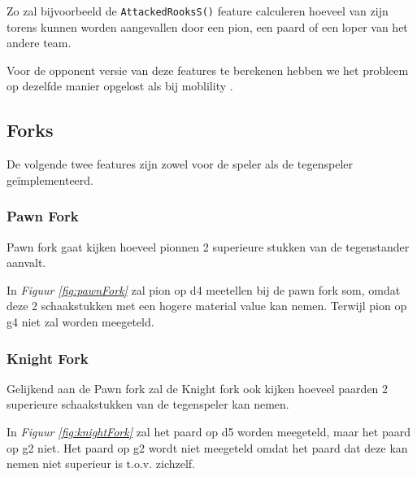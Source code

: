 \documentclass[a4paper,openany]{uantwerpenassignment}
\newcommand{\codeword}[1]{
    \colorbox{code}{\texttt{\textcolor{codetext}{#1}}}
}
\newcommand{\figref}[1]{\textit{Figuur \ref{#1}}}
\begin{document}
Zo zal bijvoorbeeld de \codeword{AttackedRooksS()} feature calculeren hoeveel van zijn torens kunnen worden aangevallen door een pion, een paard of een loper van het andere team.

Voor de opponent versie van deze features te berekenen hebben we het probleem op dezelfde manier opgelost als bij moblility .

\subsection{Forks}

De volgende twee features zijn zowel voor de speler als de tegenspeler geïmplementeerd.

\subsubsection{Pawn Fork}
Pawn fork gaat kijken hoeveel pionnen 2 superieure stukken van de tegenstander aanvalt.

In \figref{fig:pawnFork} zal pion op d4 meetellen bij de pawn fork som, omdat deze 2 schaakstukken met een hogere material value kan nemen. Terwijl pion op g4 niet zal worden meegeteld.

\subsubsection{Knight Fork}
Gelijkend aan de Pawn fork zal de Knight fork ook kijken hoeveel paarden 2 superieure schaakstukken van de tegenspeler kan nemen.

In \figref{fig:knightFork} zal het paard op d5 worden meegeteld, maar het paard op g2 niet. Het paard op g2 wordt niet meegeteld omdat het paard dat deze kan nemen niet superieur is t.o.v. zichzelf.
\end{document}
